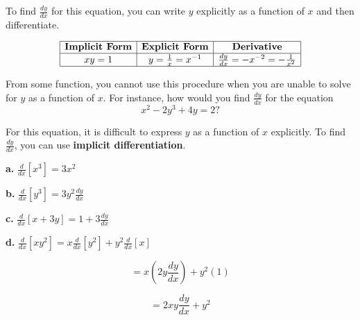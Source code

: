 \documentclass[12pt]{article}
\theoremstyle{beautifulthm}
\begin{document}
To find \(\frac{dy}{dx}\) for this equation, you can write \(y\) explicitly as a function of \(x\) and then differentiate.

\[
\begin{array}{|c|c|c|}
\hline
\textbf{Implicit Form} & \textbf{Explicit Form} & \textbf{Derivative} \\
\hline
xy = 1 & y = \frac{1}{x} = x^{-1} & \frac{dy}{dx} = -x^{-2} = -\frac{1}{x^2} \\
\hline
\end{array}
\]

From some function, you cannot use this procedure when you are unable to solve for \(y\) as a function of \(x\). For instance, how would you find \(\frac{dy}{dx}\) for the equation
\[
x^2 - 2y^3 + 4y = 2?
\]

For this equation, it is difficult to express \(y\) as a function of \(x\) explicitly. To find \(\frac{dy}{dx}\), you can use \textbf{implicit differentiation}.
\begin{tcolorbox}[colback=examplebg, colframe=red!75!black, title=\textbf{EXAMPLE 1 : Differentiating with Respect to x}, fonttitle=\bfseries, sharp corners]

\noindent
\textbf{a.} \quad \(\frac{d}{dx}\left[x^3\right] = 3x^2\)



\vspace{0.5cm}

\noindent
\textbf{b.} \quad \(\frac{d}{dx}\left[y^3\right] = 3y^2 \frac{dy}{dx}\)



\vspace{0.5cm}

\noindent
\textbf{c.} \quad \(\frac{d}{dx}\left[x + 3y\right] = 1 + 3\frac{dy}{dx}\)


\vspace{0.5cm}

\noindent
\textbf{d.} \quad \(\frac{d}{dx}\left[xy^2\right] = x \frac{d}{dx}\left[y^2\right] + y^2 \frac{d}{dx}[x]\)



\[
= x\left(2y \frac{dy}{dx}\right) + y^2(1)
\]

\[
= 2xy \frac{dy}{dx} + y^2
\]

\end{tcolorbox}
\end{document}
